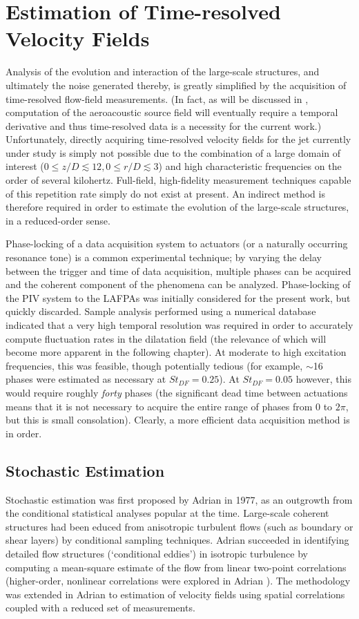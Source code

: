 \chapter{Estimation of Time-resolved Velocity Fields}
\label{sect:velocity}
Analysis of the evolution and interaction of the large-scale structures, and ultimately the noise generated thereby, is greatly simplified by the acquisition of time-resolved flow-field measurements.
(In fact, as will be discussed in , computation of the aeroacoustic source field will eventually require a temporal derivative and thus time-resolved data is a necessity for the current work.)
Unfortunately, directly acquiring time-resolved velocity fields for the jet currently under study is simply not possible due to the combination of a large domain of interest ($0 \leq z/D \lesssim 12, 0 \leq r/D \lesssim 3$) and high characteristic frequencies on the order of several kilohertz.
Full-field, high-fidelity measurement techniques capable of this repetition rate simply do not exist at present.
An indirect method is therefore required in order to estimate the evolution of the large-scale structures, in a reduced-order sense.

Phase-locking of a data acquisition system to actuators (or a naturally occurring resonance tone) is a common experimental technique; by varying the delay between the trigger and time of data acquisition, multiple phases can be acquired and the coherent component of the phenomena can be analyzed.
Phase-locking of the PIV system to the LAFPAs was initially considered for the present work, but quickly discarded.
Sample analysis performed using a numerical database indicated that a very high temporal resolution was required in order to accurately compute fluctuation rates in the dilatation field (the relevance of which will become more apparent in the following chapter).
At moderate to high excitation frequencies, this was feasible, though potentially tedious (for example, $\sim$16 phases were estimated as necessary at $St_{DF} =0.25$).
At $St_{DF} =0.05$ however, this would require roughly \textit{forty} phases (the significant dead time between actuations means that it is not necessary to acquire the entire range of phases from $0$ to $2\pi$, but this is small consolation).
Clearly, a more efficient data acquisition method is in order.
\section{Stochastic Estimation}
Stochastic estimation was first proposed by Adrian \citep{Adrian1977} in 1977, as an outgrowth from the conditional statistical analyses popular at the time. 
Large-scale coherent structures had been educed from anisotropic turbulent flows (such as boundary or shear layers) by conditional sampling techniques.
Adrian succeeded in identifying detailed flow structures (`conditional eddies') in isotropic turbulence by computing a mean-square estimate of the flow from linear two-point correlations (higher-order, nonlinear correlations were explored in Adrian \citep{Adrian1979}). 
The methodology was extended in Adrian \citep{Adrian1994} to estimation of velocity fields using spatial correlations coupled with a reduced set of measurements.

